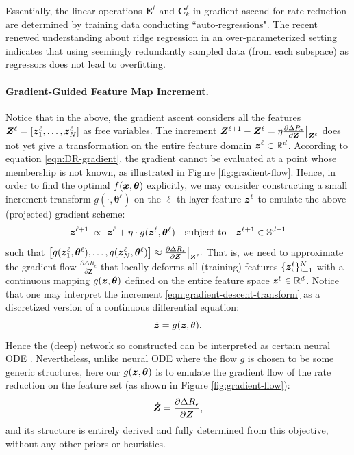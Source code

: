 \documentclass[../../book-main.tex]{subfiles}
\begin{document}
\begin{remark}
Essentially, the linear operations $\bm E^\ell$ and $\bm C_k^\ell$ in gradient ascend for rate reduction are determined by training data conducting ``auto-regressions". The recent renewed understanding about ridge regression in an over-parameterized setting \cite{yang2020rethinking,Wu2020OnTO} indicates that using seemingly redundantly sampled data (from each subspace) as regressors does not lead to overfitting.
\end{remark}

\paragraph{Gradient-Guided Feature Map Increment.} Notice that in the above, the gradient ascent considers all the features $\bm{Z}^{\ell} = [\bm{z}^{\ell}_{1}, \dots, \bm{z}^{\ell}_{N}]$ as free variables. The increment $\bm{Z}^{\ell+1} - \bm{Z}^{\ell} = \eta \frac{\partial \Delta R_{\epsilon}}{\partial \bm Z}\big|_{\bm{Z}^\ell}$ does not yet give a transformation on the entire feature domain $\bm{z}^\ell \in \mathbb{R}^d$. According to equation \eqref{eqn:DR-gradient}, the gradient cannot be evaluated at a point whose membership is not known, as illustrated in Figure \ref{fig:gradient-flow}. Hence, in order to find the optimal $f(\bm{x},\bm  \theta)$ explicitly, we may consider constructing a small increment transform $g(\cdot, \bm{\theta}^{\ell})$ on the $\ell$-th layer feature $\bm{z}^\ell$ to emulate the above (projected) gradient scheme:
\begin{equation}
\bm{z}^{\ell + 1}   \; \propto \; \bm{z}^{\ell} + \eta\cdot  g(\bm{z}^{\ell}, \bm{\theta}^{\ell}) \quad \mbox{subject to} \quad \bm{z}^{\ell +1} \in \mathbb{S}^{d-1}
\label{eqn:gradient-descent-transform}
\end{equation}
such that $\big[g(\bm{z}_1^{\ell}, \bm \theta^{\ell}), \ldots, g(\bm{z}_N^{\ell}, \bm \theta^{\ell}) \big] \approx \frac{\partial \Delta R_{\epsilon}}{\partial \bm Z}\big|_{\bm{Z}^\ell}.$ That is, we need to approximate the gradient flow $\frac{\partial \Delta R_{\epsilon}}{\partial \bm Z}$ that locally deforms all (training) features $\{\bm{z}_i^\ell\}_{i=1}^N$ with a continuous mapping $g(\bm{z},\bm \theta)$ defined on the entire feature space $\bm{z}^\ell \in \mathbb{R}^d$.  
Notice that one may interpret the increment \eqref{eqn:gradient-descent-transform} as a discretized version of a continuous  differential equation:
\begin{equation}
\dot{\bm{z}} = g(\bm{z}, \theta).
\end{equation}
Hence the (deep) network so constructed can be interpreted as certain neural ODE \cite{chen2018neural}. Nevertheless, unlike neural ODE where the flow $g$ is chosen to be some generic structures, here our $g(\bm{z}, \bm\theta)$ is to emulate the gradient flow of the rate reduction on the feature set (as shown in Figure \ref{fig:gradient-flow}): 
\begin{equation*}
    \dot{\bm{Z}} = \frac{\partial \Delta R_{\epsilon}}{\partial \bm Z},
\end{equation*} 
and its structure is entirely derived and fully determined from this objective, without any other priors or heuristics.  
\end{document}
